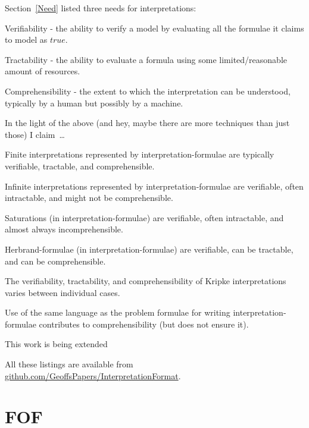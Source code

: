 \documentclass{easychair}
\newenvironment{packed_itemize}{
\vspace*{-0.3em}
\begin{itemize}
\setlength{\partopsep}{0pt}
\setlength{\itemsep}{1pt}
\setlength{\parskip}{0pt}
\setlength{\parsep}{0pt}
}{\end{itemize}}
\begin{document}
Section~\ref{Need} listed three needs for interpretations: 
\begin{packed_itemize}
\item Verifiability - the ability to verify a model by evaluating all the formulae it claims
      to model as $true$.
\item Tractability - the ability to evaluate a formula using some limited/reasonable amount of
      resources.
\item Comprehensibility - the extent to which the interpretation can be understood, typically
      by a human but possibly by a machine.
\end{packed_itemize}

In the light of the above (and hey, maybe there are more techniques than just those) I claim~\ldots
\begin{packed_itemize}
\item Finite interpretations represented by interpretation-formulae are typically verifiable, 
      tractable, and comprehensible.
\item Infinite interpretations represented by interpretation-formulae are verifiable, often 
      intractable, and might not be comprehensible.
\item Saturations (in interpretation-formulae) are verifiable, often intractable, and almost 
      always incomprehensible.
\item Herbrand-formulae (in interpretation-formulae) are verifiable, can be tractable, and can 
      be comprehensible.
\item The verifiability, tractability, and comprehensibility of Kripke interpretations varies
      between individual cases.
\item Use of the same language as the problem formulae for writing interpretation-formulae
      contributes to comprehensibility (but does not ensure it).
\end{packed_itemize}

This work is being extended 



\newpage
\appendix

All these listings are available from
\href{https://github.com/GeoffsPapers/InterpretationFormat}{github.com/GeoffsPapers/InterpretationFormat}.

\section{FOF}
\label{FOF}
\end{document}
